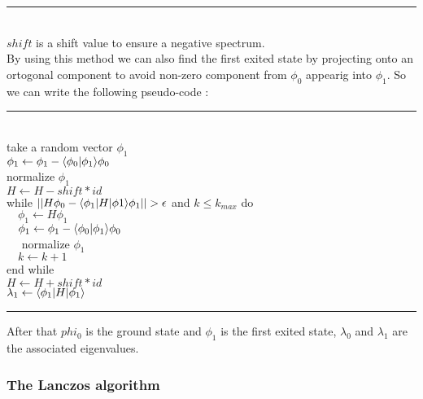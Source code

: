 \documentclass[1pt, a4paper]{article}
\begin{document}
\hrule
\noindent
\\
$shift$ is a shift value to ensure a negative spectrum.\\
By using this method we can also find the first exited state by projecting onto an ortogonal component to avoid non-zero component from $\phi_0$ appearig into $\phi_1$. So we can write the following pseudo-code :\\
\hrule
\noindent
\\
take a random vector $\phi_1$\\
$\phi_1 \leftarrow \phi_1 - \braket{\phi_0}{\phi_1}\phi_0$\\
normalize $\phi_1$\\
$H \leftarrow H - shift * id$\\
while $||H\phi_0 - \Braket{\phi_1}{H}{\phi 1}\phi_1|| > \epsilon$ and $k\leq k_{max}$ do\\
$\quad \phi_1 \leftarrow H\phi_1$\\
$\quad\phi_1 \leftarrow \phi_1 - \braket{\phi_0}{\phi_1}\phi_0$\\
$\quad$ normalize $\phi_1$\\
$\quad k \leftarrow k + 1$\\
end while\\
$H \leftarrow H + shift * id$\\
$\lambda_1 \leftarrow \Braket{\phi_1}{H}{\phi_1}$\\
\hrule
\noindent
\newpage\noindent
After that $phi_0$ is the ground state and $\phi_1$ is the first exited state, $\lambda_0$ and $\lambda_1$ are the associated eigenvalues.
\subsubsection{The Lanczos algorithm}
\label{subs:lanczos}
\noindent


           
\end{document}
